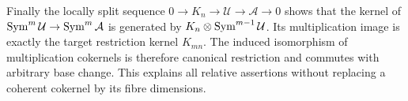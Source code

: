 Finally the locally split sequence
$0\to K_n\to\mathcal U\to\mathcal A\to0$ shows that the kernel
of $\operatorname{Sym}^m\mathcal U\to\operatorname{Sym}^m\mathcal A$ is generated by
$K_n\otimes\operatorname{Sym}^{m-1}\mathcal U$. Its multiplication image is
exactly the target restriction kernel $K_{mn}$. The induced
isomorphism of multiplication cokernels is therefore canonical
restriction and commutes with arbitrary base change. This explains
all relative assertions without replacing a coherent cokernel by
its fibre dimensions.
